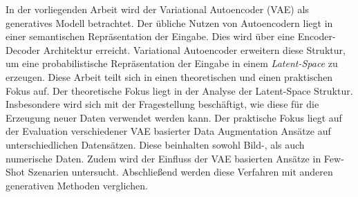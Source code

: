 In der vorliegenden Arbeit wird der Variational Autoencoder (VAE) als generatives Modell betrachtet. Der übliche Nutzen von Autoencodern liegt in einer semantischen Repräsentation der Eingabe. Dies wird über eine Encoder-Decoder Architektur erreicht. Variational Autoencoder erweitern diese Struktur, um eine probabilistische Repräsentation der Eingabe in einem \textit{Latent-Space} zu erzeugen. Diese Arbeit teilt sich in einen theoretischen und einen praktischen Fokus auf. Der theoretische Fokus liegt in der Analyse der Latent-Space Struktur. Insbesondere wird sich mit der Fragestellung beschäftigt, wie diese für die Erzeugung neuer Daten verwendet werden kann. Der praktische Fokus liegt auf der Evaluation verschiedener VAE basierter Data Augmentation Ansätze auf unterschiedlichen Datensätzen. Diese beinhalten sowohl Bild-, als auch numerische Daten. Zudem wird der Einfluss der VAE basierten Ansätze in Few-Shot Szenarien untersucht. Abschließend werden diese Verfahren mit anderen generativen Methoden verglichen.
